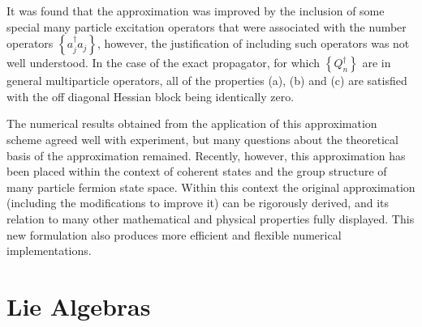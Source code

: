 \documentclass[aps,preprint]{revtex4}%
\begin{document}
It was found that the approximation was improved by the inclusion of some
special many particle excitation operators that were associated with the
number operators $\left\{  a_{j}^{\dagger}a_{j}\right\}  $, however, the
justification of including such operators was not well understood. In the case
of the exact propagator, for which $\left\{  Q_{n}^{\dagger}\right\}  $ are in
general multiparticle operators, all of the properties (a), (b) and (c) are
satisfied with the off diagonal Hessian block being identically zero.

The numerical results obtained from the application of this approximation
scheme agreed well with experiment, but many questions about the theoretical
basis of the approximation remained. Recently, however, this approximation has
been placed within the context of coherent states and the group structure of
many particle fermion state space. Within this context the original
approximation (including the modifications to improve it) can be rigorously
derived, and its relation to many other mathematical and physical properties
fully displayed. This new formulation also produces more efficient and
flexible numerical implementations.

\section{Lie Algebras\label{liealg}}
\end{document}
